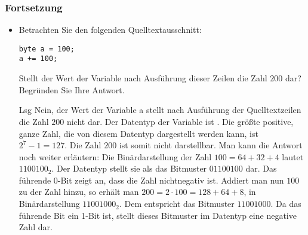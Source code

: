\begin{frame}[fragile]%
  \frametitle{Fortsetzung}%
\centering
\medskip

\begin{itemize}
\item
Betrachten Sie den folgenden Quelltextausschnitt:
\begin{verbatim}
byte a = 100;
a += 100;
\end{verbatim}
Stellt der Wert der Variable  nach Ausführung dieser Zeilen die Zahl $200$ dar?
Begründen Sie Ihre Antwort.

\item[Lsg]
Nein, der Wert der Variable a stellt nach Ausführung der Quelltextzeilen die Zahl $200$ nicht dar.
Der Datentyp der Variable ist .
Die größte positive, ganze Zahl, die von diesem Datentyp dargestellt werden kann, ist $2^7 - 1 = 127$. Die Zahl $200$ ist somit nicht darstellbar.
Man kann die Antwort noch weiter erläutern: Die Binärdarstellung der Zahl $100 = 64 + 32 + 4$ lautet $1100100_2$.
Der Datentyp  stellt sie als das Bitmuster $01100100$ dar.
Das führende 0-Bit zeigt an, dass die Zahl nichtnegativ ist.
Addiert man nun $100$ zu der Zahl hinzu, so erhält man $200 = 2 \cdot 100 = 128 + 64 + 8$, in Binärdarstellung $11001000_2$.
Dem entspricht das Bitmuster $11001000$.
Da das führende Bit ein 1-Bit ist, stellt dieses Bitmuster im Datentyp  eine negative Zahl dar.
\end{itemize}
\end{frame}